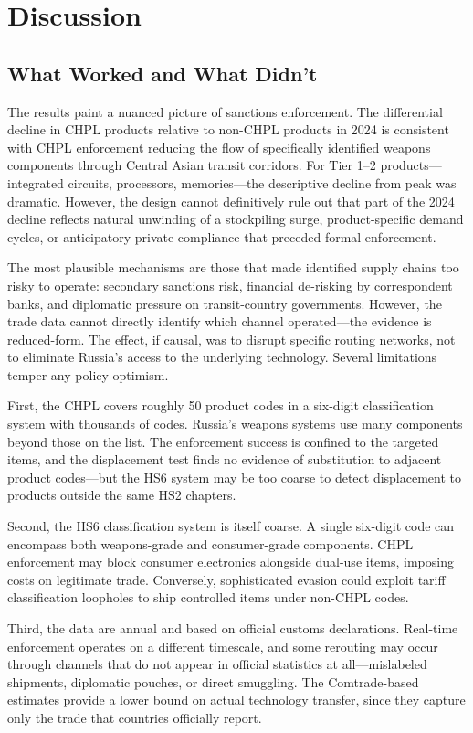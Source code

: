 \documentclass[12pt]{article}
\begin{document}
\section{Discussion}
\label{sec:discussion}

\subsection{What Worked and What Didn't}

The results paint a nuanced picture of sanctions enforcement. The differential decline in CHPL products relative to non-CHPL products in 2024 is consistent with CHPL enforcement reducing the flow of specifically identified weapons components through Central Asian transit corridors. For Tier 1--2 products---integrated circuits, processors, memories---the descriptive decline from peak was dramatic. However, the design cannot definitively rule out that part of the 2024 decline reflects natural unwinding of a stockpiling surge, product-specific demand cycles, or anticipatory private compliance that preceded formal enforcement.

The most plausible mechanisms are those that made identified supply chains too risky to operate: secondary sanctions risk, financial de-risking by correspondent banks, and diplomatic pressure on transit-country governments. However, the trade data cannot directly identify which channel operated---the evidence is reduced-form. The effect, if causal, was to disrupt specific routing networks, not to eliminate Russia's access to the underlying technology. Several limitations temper any policy optimism.

First, the CHPL covers roughly 50 product codes in a six-digit classification system with thousands of codes. Russia's weapons systems use many components beyond those on the list. The enforcement success is confined to the targeted items, and the displacement test finds no evidence of substitution to adjacent product codes---but the HS6 system may be too coarse to detect displacement to products outside the same HS2 chapters.

Second, the HS6 classification system is itself coarse. A single six-digit code can encompass both weapons-grade and consumer-grade components. CHPL enforcement may block consumer electronics alongside dual-use items, imposing costs on legitimate trade. Conversely, sophisticated evasion could exploit tariff classification loopholes to ship controlled items under non-CHPL codes.

Third, the data are annual and based on official customs declarations. Real-time enforcement operates on a different timescale, and some rerouting may occur through channels that do not appear in official statistics at all---mislabeled shipments, diplomatic pouches, or direct smuggling. The Comtrade-based estimates provide a lower bound on actual technology transfer, since they capture only the trade that countries officially report.
\end{document}
